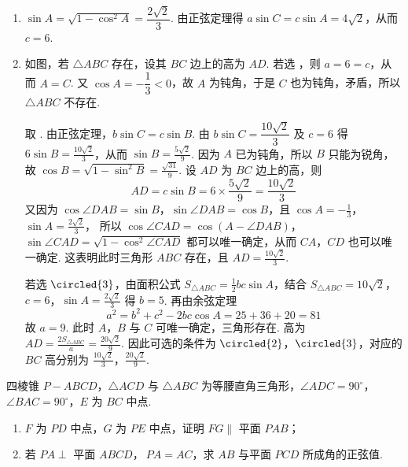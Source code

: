 \begin{solution}
\begin{enumerate}
\item \(\sin A=\sqrt{1-\cos^2A}=\dfrac{2\sqrt2}{3}\). 由正弦定理得 \(a\sin C=c\sin A=4\sqrt2\)，从而 \(c=6\).

\item 如图，若 \(\triangle ABC\) 存在，设其 \(BC\) 边上的高为 \(AD\).
若选 ，则 \(a=6=c\)，从而 \(A=C\). 又 \(\cos A=-\dfrac13<0\)，故 \(A\) 为钝角，于是 \(C\) 也为钝角，矛盾，所以 \(\triangle ABC\) 不存在.

取 . 由正弦定理，\(b\sin C=c\sin B\). 由 \(b\sin C=\dfrac{10\sqrt2}{3}\) 及 \(c=6\) 得 \(6\sin B=\frac{10\sqrt2}{3}\)，从而 \(\sin B=\frac{5\sqrt2}{9}\). 因为 \(A\) 已为钝角，所以 \(B\) 只能为锐角，故 \(\cos B=\sqrt{1-\sin^2 B}=\frac{\sqrt{31}}{9}\).
设 \(AD\) 为 \(BC\) 边上的高，则
\[
AD=c\sin B=6\times\frac{5\sqrt2}{9}=\frac{10\sqrt2}{3}
\]
又因为 \(\cos\angle DAB=\sin B\)，\(\sin\angle DAB=\cos B\)，且 \(\cos A=-\frac13\)，\(\sin A=\frac{2\sqrt2}{3}\)，
所以 \(\cos\angle CAD=\cos\left( A-\angle DAB \right)\)，\(\sin\angle CAD=\sqrt{1-\cos^2\angle CAD}\) 都可以唯一确定，从而 \(CA\)，\(CD\) 也可以唯一确定. 这表明此时三角形 \(ABC\) 存在，且
\(AD=\frac{10\sqrt2}{3}\).

若选 \(\circled{3}\)，由面积公式 \(S_{\triangle ABC}=\frac12 bc\sin A\)，结合 \(S_{\triangle ABC}=10\sqrt2\)，\(c=6\)，\(\sin A=\frac{2\sqrt2}{3}\) 得 \(b=5\). 再由余弦定理
\[
a^2=b^2+c^2-2bc\cos A=25+36+20=81
\]
故 \(a=9\). 此时 \(A\)，\(B\) 与 \(C\) 可唯一确定，三角形存在. 高为
\(AD=\frac{2S_{\triangle ABC}}a=\frac{20\sqrt2}{9}\).
因此可选的条件为 \(\circled{2}\)，\(\circled{3}\)，对应的 \(BC\) 高分别为 \(\frac{10\sqrt2}{3}\)，\(\frac{20\sqrt2}{9}\).
\end{enumerate}
\end{solution}

\begin{problem}
四棱锥 \(P-ABCD\)，\(\triangle ACD\) 与 \(\triangle ABC\) 为等腰直角三角形，\(\angle ADC=90^\circ\)，\(\angle BAC=90^\circ\)，\(E\) 为 \(BC\) 中点.

\begin{enumerate}
\item \(F\) 为 \(PD\) 中点，\(G\) 为 \(PE\) 中点，证明 \(FG\parallel\) 平面 \(PAB\)；

\item 若 \(PA\perp\) 平面 \(ABCD\)，\(\ PA=AC\)，求 \(AB\) 与平面 \(PCD\) 所成角的正弦值.
\end{enumerate}
\end{problem}

